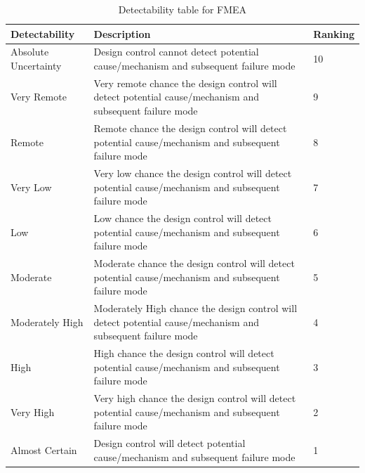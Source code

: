 \documentclass[ExampleMasters.tex]{subfiles}
\begin{document}
\begin{table}[h]
	\centering
	\caption{Detectability table for FMEA \cite{FMEA_tables}}
	\label{tab:fmea_detectability}
	\begin{tabular}{p{4cm}|p{9cm}|p{2cm}|}
		Detectability & Description & Ranking   \\ \hline
		Absolute Uncertainty & Design control cannot detect potential cause/mechanism and
		subsequent failure mode & 10        \\
		Very Remote &  Very remote chance the design control will detect potential
		cause/mechanism and subsequent failure mode & 9    \\
		Remote &  Remote chance the design control will detect potential
		cause/mechanism and subsequent failure mode & 8       \\
		Very Low & Very low chance the design control will detect potential
		cause/mechanism and subsequent failure mode & 7   \\
		Low &  Low chance the design control will detect potential
		cause/mechanism and subsequent failure mode & 6  \\
		Moderate & Moderate chance the design control will detect potential
		cause/mechanism and subsequent failure mode & 5  \\
		Moderately High & Moderately High chance the design control will detect
		potential cause/mechanism and subsequent failure mode & 4 \\
	High & High chance the design control will detect potential
	cause/mechanism and subsequent failure mode & 3 \\
	Very High	& Very high chance the design control will detect potential
	cause/mechanism and subsequent failure mode & 2 \\
		Almost Certain & Design control will detect potential cause/mechanism and
		subsequent failure mode & 1 \\
	\end{tabular} \\
\end{table}
 






 

  
  
  
 

  
  
 
\end{document}
